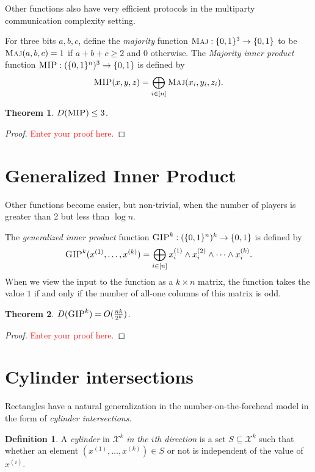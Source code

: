 \documentclass[11pt]{amsart}
\theoremstyle{plain}
\newtheorem{theorem}{Theorem}
\theoremstyle{definition}
\newtheorem{definition}{Definition}
\theoremstyle{plain}
\newcommand{\calX}{\mathcal{X}}
\newcommand{\GIP}{\textsc{GIP}}
\newcommand{\Maj}{\textsc{Maj}}
\newcommand{\MIP}{\textsc{MIP}}
\newcommand{\replacethistext}[1]{\textcolor{red}{#1}}
\begin{document}
Other functions also have very efficient protocols in the multiparty communication complexity setting. 

For three bits $a,b,c$, define the \emph{majority} function $\Maj : \{0,1\}^3 \to \{0,1\}$ to be $\Maj(a,b,c) = 1$ if $a+b+c \ge 2$ and $0$ otherwise. The \emph{Majority inner product} function $\MIP : (\{0,1\}^n)^3 \to \{0,1\}$ is defined by
\[
\MIP(x,y,z) = \bigoplus_{i \in [n]} \Maj(x_i,y_i,z_i).
\]
\begin{theorem}
$D(\MIP) \le 3$.
\end{theorem}

\begin{proof}
\replacethistext{Enter your proof here.}
\end{proof}


\newpage 
\section{Generalized Inner Product}

Other functions become easier, but non-trivial, when the number of players is greater than 2 but less than $\log n$.

The \emph{generalized inner product} function $\GIP^k : (\{0,1\}^n)^k \to \{0,1\}$ is defined by
\[
\GIP^k(x^{(1)},\ldots,x^{(k)}) = \bigoplus_{i \in [n]} x^{(1)}_i \wedge x^{(2)}_i \wedge \cdots \wedge x^{(k)}_i.
\]
When we view the input to the function as a $k \times n$ matrix, the function takes the value $1$ if and only if the number of all-one columns of this matrix is odd. 

\begin{theorem}
$D(\GIP^k) = O(\frac{nk}{2^k})$.
\end{theorem}

\begin{proof}
\replacethistext{Enter your proof here.}
\end{proof}



\newpage 
\section{Cylinder intersections}

Rectangles have a natural generalization in the number-on-the-forehead model in the form of \emph{cylinder intersections}.

\begin{definition}
A \emph{cylinder} in $\calX^k$ \emph{in the $i$th direction} is a set $S \subseteq \calX^k$ such that whether an element $(x^{(1)},\ldots,x^{(k)}) \in S$ or not is independent of the value of $x^{(i)}$.
\end{definition}
\end{document}
